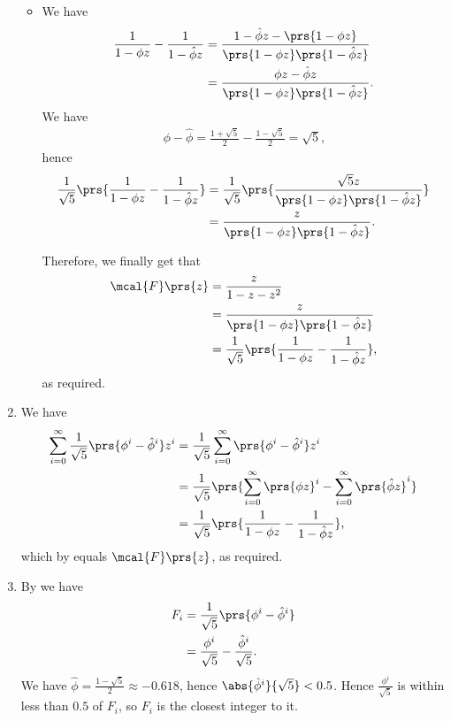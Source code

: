 \documentclass[oneside]{scrbook}
\theoremstyle{definition}
\begin{document}
\begin{problem}
\begin{enumerate}[label=\alph*.]
\begin{itemize}
\item \label{item:fibonacci-generating-equation}
We have
\begin{align*}
\frac{1}{1 - \phi z} - \frac{1}{1 - \hat{\phi}z} &=
\frac{1 - \hat{\phi}z - \prs{1 - \phi z}}{\prs{1 - \phi z}\prs{1 - \hat{\phi}z}}
\\&=
\frac{\phi z - \hat{\phi}z}{\prs{1 - \phi z}\prs{1 - \hat{\phi}z}} \text{.}
\end{align*}
We have
\begin{align*}
\phi - \hat{\phi} = \frac{1 + \sqrt{5}}{2} - \frac{1 - \sqrt{5}}{2} = \sqrt{5} \text{,}
\end{align*}
hence
\begin{align*}
\frac{1}{\sqrt{5}} \prs{\frac{1}{1 - \phi z} - \frac{1}{1 - \hat{\phi}z}} &= \frac{1}{\sqrt{5}} \prs{\frac{\sqrt{5} z}{\prs{1 - \phi z}\prs{1 - \hat{\phi}z}}}
\\&= \frac{z}{\prs{1 - \phi z}\prs{1 - \hat{\phi}z}} \text{.}
\end{align*}

Therefore, we finally get that
\begin{align*}
\mcal{F}\prs{z} &= \frac{z}{1 - z - z^2}
\\&= \frac{z}{\prs{1 - \phi z}\prs{1 - \hat{\phi} z}}
\\&= \frac{1}{\sqrt{5}} \prs{\frac{1}{1 - \phi z} - \frac{1}{1 - \hat{\phi}z}} \text{,}
\end{align*}
as required.
\end{itemize}

\item \label{item:fibonacci-generating-series}
We have
\begin{align*}
\sum_{i=0}^{\infty} \frac{1}{\sqrt{5}} \prs{\phi^i - \hat{\phi}^i} z^i
&=
\frac{1}{\sqrt{5}} \sum_{i=0}^{\infty} \prs{\phi^i - \hat{\phi}^i} z^i
\\&=
\frac{1}{\sqrt{5}} \prs{\sum_{i=0}^{\infty}  \prs{\phi z}^i - \sum_{i=0}^{\infty} \prs{\hat{\phi} z}^i}
\\&= \frac{1}{\sqrt{5}} \prs{\frac{1}{1 - \phi z} - \frac{1}{1 - \hat{\phi}z}} \text{,}
\end{align*}
which by  equals $\mcal{F}\prs{z}$, as required.

\item
By  we have
\begin{align*}
F_i &= \frac{1}{\sqrt{5}} \prs{\phi^i - \hat{\phi}^i}
\\&= \frac{\phi^i}{\sqrt{5}} - \frac{\hat{\phi}^i}{\sqrt{5}} \text{.}
\end{align*}
We have $\hat{\phi} = \frac{1 - \sqrt{5}}{2} \approx -0.618$, hence $\abs{\hat{\phi}^i}{\sqrt{5}} < 0.5$. Hence
$\frac{\phi^i}{\sqrt{5}}$ is within less than $0.5$ of $F_i$, so $F_i$ is the closest integer to it.


\end{enumerate}
\end{problem}
\end{document}
